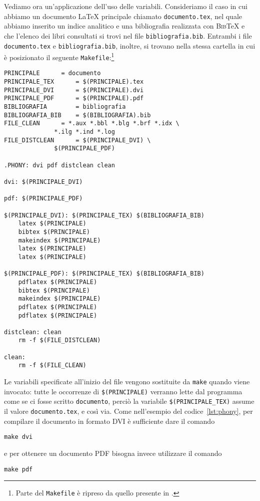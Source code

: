 Vediamo ora un'applicazione dell'uso delle variabili.  Consideriamo il caso in
cui abbiamo un documento \LaTeX{}
principale chiamato \verb|documento.tex|, nel quale abbiamo inserito un indice
analitico e una bibliografia realizzata con \textsc{Bib}\TeX{}
e che l'elenco dei libri consultati si trovi nel file \verb|bibliografia.bib|.
Entrambi i file \verb|documento.tex| e \verb|bibliografia.bib|, inoltre, si
trovano nella stessa cartella in cui è posizionato il seguente
\verb|Makefile|:\footnote{Parte del \texttt{Makefile} è ripreso da quello
  presente in \textcite[61]{caucci:tabelle}.}
\begin{lstlisting}[caption={Esempio di \texttt{Makefile} che utilizza le
variabili},label=lst:variabili]
PRINCIPALE 		= documento
PRINCIPALE_TEX		= $(PRINCIPALE).tex
PRINCIPALE_DVI		= $(PRINCIPALE).dvi
PRINCIPALE_PDF		= $(PRINCIPALE).pdf
BIBLIOGRAFIA		= bibliografia
BIBLIOGRAFIA_BIB	= $(BIBLIOGRAFIA).bib
FILE_CLEAN		= *.aux *.bbl *.blg *.brf *.idx \
			  *.ilg *.ind *.log
FILE_DISTCLEAN		= $(PRINCIPALE_DVI) \
			  $(PRINCIPALE_PDF)

.PHONY: dvi pdf distclean clean

dvi: $(PRINCIPALE_DVI)

pdf: $(PRINCIPALE_PDF)

$(PRINCIPALE_DVI): $(PRINCIPALE_TEX) $(BIBLIOGRAFIA_BIB)
	latex $(PRINCIPALE)
	bibtex $(PRINCIPALE)
	makeindex $(PRINCIPALE)
	latex $(PRINCIPALE)
	latex $(PRINCIPALE)

$(PRINCIPALE_PDF): $(PRINCIPALE_TEX) $(BIBLIOGRAFIA_BIB)
	pdflatex $(PRINCIPALE)
	bibtex $(PRINCIPALE)
	makeindex $(PRINCIPALE)
	pdflatex $(PRINCIPALE)
	pdflatex $(PRINCIPALE)

distclean: clean
	rm -f $(FILE_DISTCLEAN)

clean:
	rm -f $(FILE_CLEAN)
\end{lstlisting}
Le variabili specificate all'inizio del file vengono sostituite da \verb|make|
quando viene invocato: tutte le occorrenze di
\verb|$(PRINCIPALE)| verranno lette dal programma come se ci fosse scritto
\verb|documento|, perciò la variabile \verb|$(PRINCIPALE_TEX)|
assume il valore \verb|documento.tex|, e così via. Come nell'esempio del
codice~\ref{lst:phony}, per compilare il documento in formato \textsc{DVI} è
sufficiente dare il comando
\begin{verbatim}
make dvi
\end{verbatim}
e per ottenere un documento \textsc{PDF} bisogna invece utilizzare il comando
\begin{verbatim}
make pdf
\end{verbatim}

